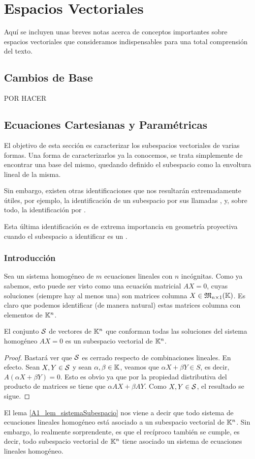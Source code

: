 \chapter{Espacios Vectoriales}
Aquí se incluyen unas breves notas acerca de conceptos importantes sobre espacios vectoriales que consideramos indispensables para una total comprensión del texto.
\section{Cambios de Base}
POR HACER
\section{Ecuaciones Cartesianas y Paramétricas}
El objetivo de esta sección es caracterizar los subespacios vectoriales de varias formas. Una forma de caracterizarlos ya la conocemos, se trata simplemente de encontrar una base del mismo, quedando definido el subespacio como la envoltura lineal de la misma.

Sin embargo, existen otras identificaciones que nos resultarán extremadamente útiles, por ejemplo, la identificación de un subespacio por sus llamadas , y, sobre todo, la identificación por .

Esta última identificación es de extrema importancia en geometría proyectiva cuando el subespacio a identificar es un .
\subsection{Introducción}
Sea un sistema homogéneo de $m$ ecuaciones lineales con $n$ incógnitas. Como ya sabemos, esto puede ser visto como una ecuación matricial $AX=0$, cuyas soluciones (siempre hay al menos una) son matrices columna $X\in\mathfrak{M}_{n\times1}(\mathbb{K})$. Es claro que podemos identificar (de manera natural) estas matrices columna con elementos de $\mathbb{K}^n$.

\begin{lem}
	\label{A1_lem_sistemaSubespacio}
	El conjunto $\mathcal{S}$ de vectores de $\mathbb{K}^n$ que conforman todas las soluciones del sistema homogéneo $AX=0$ es un subespacio vectorial de $\mathbb{K}^n$.
\end{lem}
\begin{proof}
	Bastará ver que $\mathcal{S}$ es cerrado respecto de combinaciones lineales. En efecto. Sean $X,Y\in\mathcal{S}$ y sean $\alpha,\beta\in\mathbb{K}$, veamos que $\alpha X+\beta Y\in S$, es decir, $A(\alpha X+\beta Y)=0$. Esto es obvio ya que por la propiedad distributiva del producto de matrices se tiene que $\alpha AX+\beta AY$. Como $X,Y\in\mathcal{S}$, el resultado se sigue.
\end{proof}
El lema \ref{A1_lem_sistemaSubespacio} nos viene a decir que todo sistema de ecuaciones lineales homogéneo está asociado a un subespacio vectorial de $\mathbb{K}^n$. Sin embargo, lo realmente sorprendente, es que el recíproco también se cumple, es decir, todo subespacio vectorial de $\mathbb{K}^n$ tiene asociado un sistema de ecuaciones lineales homogéneo.
